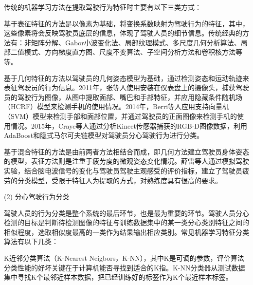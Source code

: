 传统的机器学习方法在提取驾驶行为特征时主要有以下三类方式：


基于表征特征的方法是以像素为基础，将变换系数映射为驾驶行为的特征，其中，这些像素将会反映驾驶员底层的信息，体现了驾驶人员的细节信息。传统经典的方法有：非矩阵分解\cite{24}、Gabor小波变化法\cite{18,19}、局部纹理模式\cite{17}、多尺度几何分析算法\cite{21}、局部二值模式\cite{15,16}、方向梯度直方图\cite{20}、尺度不变算法\cite{22}、子空间分析方法\cite{23}和卷积核方法等等。


基于几何特征的方法以驾驶员的几何姿态模型为基础，通过检测姿态和运动轨迹来表征驾驶员的行为信息。2011年，张等人\cite{25}使用安装在仪表盘上的摄像头，捕获驾驶员的驾驶行为图像，从图中提取面部、嘴巴和手部特征，并应用隐藏条件随机场（HCRF）模型来检测手机的使用情况。2014年，Berri等人\cite{26}应用支持向量机（SVM）模型来检测手部和面部位置，并通过驾驶员的正面图像来检测手机的使用情况。2015年，Craye等人\cite{27}通过分析Kinect传感器捕获的RGB-D图像数据，利用AdaBoost和隐式马尔可夫链模型对驾驶员分心驾驶行为进行分类。

基于混合特征的方法是由前两者方法相结合而成，即几何方法建立驾驶员身体姿态的模型，表征方法则是注重于疲劳度的微观姿态变化情况。薛雷等人\cite{29}通过模拟驾驶实验，结合脑电波信号的变化与驾驶员驾驶主观感受的评价指标，建立了驾驶员疲劳的分类模型，受限于特征人为提取的方式，对熟练度具有很高的要求。

(2)	分心驾驶行为分类

驾驶人员的行为分类是整个系统的最后环节，也是最为重要的环节。驾驶人员分心检测的目标是判断待检测图像的特征与训练数据集中的某一类分心类别特征之间的相似程度，选取相似度最高的一类作为结果输出相应类别。常见机器学习特征分类算法有以下几类：

K近邻分类算法（K-Nearest Neigbors，K-NN），其中K是可调的参数，评价算法分类性能的好坏关键在于计算机能否寻找到适合的K指。K-NN分类器从测试数据集中寻找K个最邻近样本数据，把已经训练好的标签作为K个最近样本标签。

